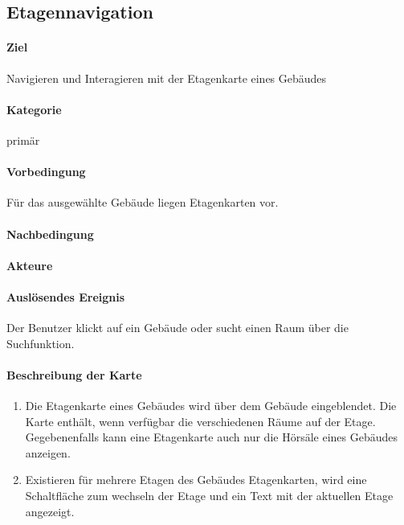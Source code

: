 \subsection{Etagennavigation}
\label{Etagennavigation}
\paragraph{Ziel}
Navigieren und Interagieren mit der Etagenkarte eines Gebäudes
\paragraph{Kategorie}
primär
\paragraph{Vorbedingung}
Für das ausgewählte Gebäude liegen Etagenkarten vor.
\paragraph{Nachbedingung}

\paragraph{Akteure}

\paragraph{Auslösendes Ereignis}
Der Benutzer klickt auf ein Gebäude oder sucht einen Raum über die Suchfunktion.
\paragraph{Beschreibung der Karte}
\begin{enumerate}
    \item Die Etagenkarte eines Gebäudes wird über dem Gebäude eingeblendet. Die Karte enthält, wenn verfügbar die verschiedenen Räume auf der Etage. Gegebenenfalls kann eine Etagenkarte auch nur die Hörsäle eines Gebäudes anzeigen.
    \item Existieren für mehrere Etagen des Gebäudes Etagenkarten, wird eine Schaltfläche zum wechseln der Etage und ein Text mit der aktuellen Etage angezeigt.
\end{enumerate}
